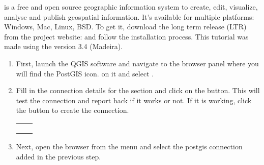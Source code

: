 \documentclass[a4paper,11pt,english]{sphinxmanual}
\begin{document}
 is a free and open source geographic information system to create, edit, visualize, analyse and publish geospatial information. It’s available for multiple platforms: Windows, Mac, Linux, BSD. To get it, download the long term release (LTR) from the project website:  and follow the installation process. This tutorial was made using the version 3.4 (Madeira).
\begin{enumerate}
\def\theenumi{\arabic{enumi}}
\def\labelenumi{\theenumi .}
\makeatletter\def\p@enumii{\p@enumi \theenumi .}\makeatother
\item {} 
First, launch the QGIS software and navigate to the browser panel where you will find the PostGIS icon.  on it and select .

\noindent{}

\item {} 
Fill in the connection details for the  section and click on the  button. This will test the connection and report back if it works or not. If it is working, click the  button to create the connection.


\begin{savenotes}\sphinxattablestart
\centering
\begin{tabulary}{\linewidth}[t]{|T|T|}
\hline

&
\\
\hline
{}
&
\\
\hline
{}
&
 
\\
\hline
{}
&
\\
\hline
\end{tabulary}
\par
\sphinxattableend\end{savenotes}

\noindent{}

\item {} 
Next, open the  browser from the menu  and select the postgis connection added in the previous step.


\end{enumerate}
\end{document}

